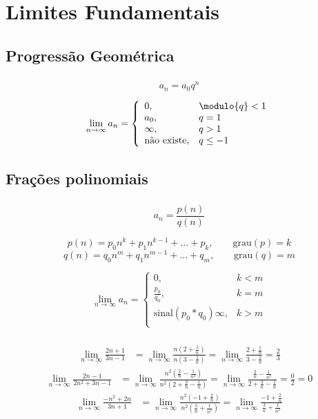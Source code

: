 \documentclass[10 pt]{beamer}
\newcommand{\myframe}[1]{
\begin{frame}
 \frametitle{\insertsection \qquad {\small \insertsubsection}}
#1
\end{frame}}
\newcommand{\limninf}{\lim_{n\rightarrow\infty}}
\begin{document}
\section{Limites Fundamentais}

\subsection{Progressão Geométrica}

\myframe {
  $$a_n = a_0q^n$$

  $$ \limninf a_n = \left\{
    \begin{array}{ll}
      0, & \modulo{q} < 1 \\
      a_0, & q = 1 \\
      \infty, & q > 1 \\
      \mbox{não existe}, & q \leq -1
    \end{array}
    \right. $$
}

\subsection{Frações polinomiais}

\myframe {
  $$ a_n = \frac{p(n)}{q(n)} $$

  $$ p(n) = p_0n^k + p_1n^{k-1} + \dots + p_k, \qquad \mbox{grau}(p) = k $$
  $$ q(n) = q_0n^m + q_1n^{m-1} + \dots + q_m, \qquad \mbox{grau}(q) = m $$
  
  $$ \limninf a_n = \left\{
    \begin{array}{ll}
      0, & k < m \\ 
      \frac{p_0}{q_0}, & k = m \\
      \mbox{sinal}(p_0*q_0)\infty, & k > m \\
    \end{array}
    \right. $$
}

\myframe {
  \begin{align*}
    \limninf \frac{2n + 1}{3n - 1} & =
      \limninf \frac{n(2 + \frac{1}{n})}{n(3 - \frac{1}{n})} =
      \limninf \frac{2 + \frac{1}{n}}{3 - \frac{1}{n}} = \frac{2}{3}
  \end{align*}
  \vspace{0.5 cm}
  \begin{align*}
    \limninf \frac{2n - 1}{2n^2 + 3n - 1} & =
      \limninf \frac{n^2(\frac{2}{n} - \frac{1}{n^2})}{n^2(2 + \frac{3}{n} - \frac{1}{n})} =
      \limninf \frac{\frac{2}{n} - \frac{1}{n^2}}{2+\frac{3}{n}-\frac{1}{n}} = \frac{0}{2} = 0
  \end{align*}
  \vspace{0.5 cm}
  \begin{align*}
    \limninf \frac{-n^2 + 2n}{3n + 1} & =
      \limninf \frac{n^2(-1 + \frac{2}{n})}{n^2(\frac{3}{n}+\frac{1}{n^2})} =
      \limninf \frac{-1+\frac{2}{n}}{\frac{3}{n}+\frac{1}{n^2}}
  \end{align*}
}
\end{document}
